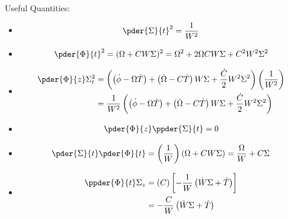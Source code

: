 Useful Quantities:
\begin{itemize}
 \item 
\begin{equation}
\begin{split}
\pder{\Sigma}{t}^2  & = \frac{1}{W^2}\\
\end{split}
\end{equation}

\item
\begin{equation}
\begin{split}
\pder{\Phi}{t}^2 & = (\Omega + CW\Sigma)^2 = \Omega^2 + 2\Omega C W \Sigma + C^2 W^2 \Sigma^2\\
\end{split}
\end{equation}

\item
\begin{equation}
\begin{split}
\pder{\Phi}{z} \Sigma_{t}^2 &= \left(\left(\dot{\phi}- \Omega\dot{T}\right) + \left(\dot{\Omega}- C\dot{T}\right) W \Sigma  + \frac{\dot{C}}{2}W^2 \Sigma^2 \right)\left(\frac{1}{W^2}\right) \\
                      &= \frac{1}{W^2}\left(\left(\dot{\phi}- \Omega\dot{T}\right) + \left(\dot{\Omega}- C\dot{T}\right) W \Sigma  + \frac{\dot{C}}{2}W^2 \Sigma^2 \right) \\
\end{split}
\end{equation}

\item
\begin{equation}
\begin{split}
\pder{\Phi}{z} \ppder{\Sigma}{t} &= 0 \\
\end{split}
\end{equation}

\item
\begin{equation}
\begin{split}
\pder{\Sigma}{t} \pder{\Phi}{t} &= \left(\frac{1}{W}\right) \left( \Omega + C W \Sigma \right) = \frac{\Omega}{W} + C \Sigma\\
\end{split}
\end{equation}

\item
\begin{equation}
\begin{split}
 \ppder{\Phi}{t} \Sigma_{z} &=  \left( C \right) \left[-\frac{1}{W}\left(\dot{W}\Sigma + \dot{T} \right) \right] \\
                      &=  -\frac{C}{W}\left( \dot{W}\Sigma  + \dot{T}\right)  \\
\end{split}
\end{equation}


\end{itemize}
